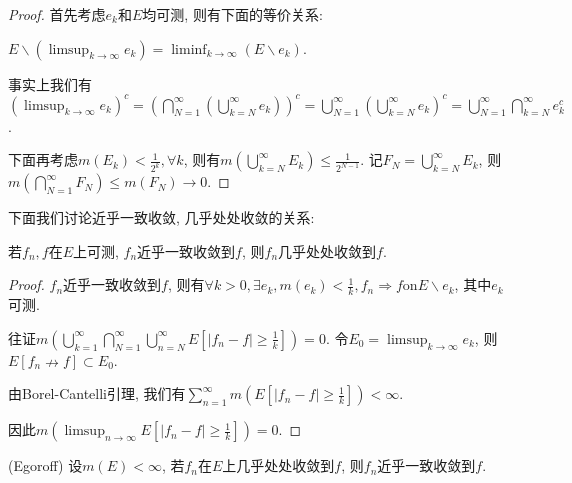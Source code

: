 \documentclass[theorem=false,mathfont=none,openany,sub3section]{easybook}
\begin{document}
\begin{proof}
  首先考虑$e_k$和$E$均可测, 则有下面的等价关系:\par
  $E\backslash \left(\limsup_{k \to \infty}e_k \right)= \liminf_{k\to \infty}\left(E\backslash e_k\right)$.\par
  事实上我们有$\left(\limsup_{k\to \infty}e_k\right)^{c}=\left(\bigcap_{N=1}^{\infty}\left(\bigcup_{k=N}^{\infty}e_k\right)\right)^{c}=\bigcup_{N=1}^{\infty}\left(\bigcup_{k=N}^{\infty}e_k\right)^{c} = \bigcup_{N=1}^{\infty}\bigcap_{k=N}^{\infty}e_k^c$.\par
  下面再考虑$m(E_k)<\frac{1}{2^k}, \forall k$, 则有$m\left(\bigcup_{k=N}^{\infty}E_k\right)\leqslant \frac{1}{2^{N-1}}$. 记$F_N = \bigcup_{k=N}^{\infty}E_k$, 则$m\left(\bigcap_{N=1}^{\infty}F_N\right)\leqslant m\left(F_N\right)\to 0$.\par
\end{proof}

下面我们讨论近乎一致收敛, 几乎处处收敛的关系:\par

\begin{theorem}
  若$f_n,f$在$E$上可测, $f_n$近乎一致收敛到$f$, 则$f_n$几乎处处收敛到$f$.\par
\end{theorem}

\begin{proof}
  $f_n$近乎一致收敛到$f$, 则有$\forall k >0, \exists {e_k}, m(e_k)<\frac{1}{k}, f_n \Rightarrow f \text{on} E\backslash e_k$, 其中$e_k$可测.\par
  往证$m\left(\bigcup_{k=1}^{\infty}\bigcap_{N=1}^{\infty}\bigcup_{n=N}^{\infty} E\left[\left|f_n-f\right|\geqslant \frac{1}{k}\right]\right)=0$. 令$E_0=\limsup_{k \to \infty}e_k$, 则$E\left[f_n\nrightarrow f\right]\subset E_0$.\par
  由Borel-Cantelli引理, 我们有$\sum_{n=1}^{\infty}m\left(E\left[\left|f_n-f\right|\geqslant \frac{1}{k}\right]\right)<\infty$. \par
  因此$m\left(\limsup_{n \to \infty}E\left[\left|f_n-f\right|\geqslant \frac{1}{k}\right]\right)=0$.\par
\end{proof}

\begin{theorem}
  (Egoroff) 设$m(E)<\infty$, 若$f_n$在$E$上几乎处处收敛到$f$, 则$f_n$近乎一致收敛到$f$.\par
\end{theorem}
\end{document}
